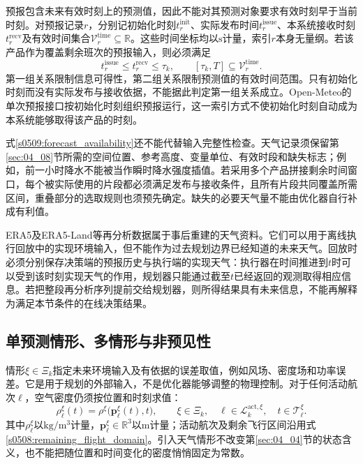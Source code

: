 预报包含未来有效时刻上的预测值，因此不能对其预测对象要求有效时刻早于当前时刻。对预报记录$r$，分别记初始化时刻$t_r^{\mathrm{init}}$、实际发布时间$t_r^{\mathrm{issue}}$、本系统接收时刻$t_r^{\mathrm{recv}}$及有效时间集合$\mathcal V_r^{\mathrm{time}}\subseteq\mathbb R$。这些时间坐标均以$\mathrm s$计量，索引$r$本身无量纲。若该产品作为覆盖剩余班次的预报输入，则必须满足
\begin{equation}
 t_r^{\mathrm{issue}}\le t_r^{\mathrm{recv}}\le\tau_k,
 \qquad
 [\tau_k,T]\subseteq\mathcal V_r^{\mathrm{time}}.
 \label{s0509:forecast_availability}
\end{equation}
第一组关系限制信息可得性，第二组关系限制预测值的有效时间范围。只有初始化时刻而没有实际发布与接收依据，不能据此判定第一组关系成立。Open-Meteo的单次预报接口按初始化时刻组织预报运行，这一索引方式不使初始化时刻自动成为本系统能够取得该产品的时刻\cite{OpenMeteoRuns}。

式\eqref{s0509:forecast_availability}还不能代替输入完整性检查。天气记录须保留第\ref{sec:04_08}节所需的空间位置、参考高度、变量单位、有效时段和缺失标志；例如，前一小时降水不能被当作瞬时降水强度插值。若采用多个产品拼接剩余时间窗口，每个被实际使用的片段都必须满足发布与接收条件，且所有片段共同覆盖所需区间，重叠部分的选取规则也须预先确定。缺失的必要天气量不能由优化器自行补成有利值。

ERA5及ERA5-Land等再分析数据属于事后重建的天气资料\cite{OpenMeteoHistory}。它们可以用于离线执行回放中的实现环境输入，但不能作为过去规划边界已经知道的未来天气。回放时必须分别保存决策端的预报历史与执行端的实现天气：执行器在时间推进到$t$时可以受到该时刻实现天气的作用，规划器只能通过截至$t$已经返回的观测取得相应信息。若把整段再分析序列提前交给规划器，则所得结果具有未来信息，不能再解释为满足本节条件的在线决策结果。

\subsection{单预测情形、多情形与非预见性}

情形$\xi\in\Xi_k$指定未来环境输入及有依据的误差取值，例如风场、密度场和功率误差。它是用于规划的外部输入，不是优化器能够调整的物理控制。对于任何活动航次$\ell$，空气密度仍须按位置和时刻求值：
\begin{equation}
 \rho_\ell^\xi(t)
 =\rho^\xi\bigl(\mathbf p_\ell^\xi(t),t\bigr),
 \qquad \xi\in\Xi_k,\quad
 \ell\in\mathcal L_k^{\mathrm{act},\xi},\quad
 t\in\mathcal T_\ell^\xi.
 \label{s0509:scenario_density}
\end{equation}
其中$\rho_\ell^\xi$以$\mathrm{kg/m^3}$计量，$\mathbf p_\ell^\xi\in\mathbb R^3$以$\mathrm m$计量；活动航次及剩余飞行区间沿用式\eqref{s0508:remaining_flight_domain}。引入天气情形不改变第\ref{sec:04_04}节的状态含义，也不能把随位置和时间变化的密度悄悄固定为常数。

